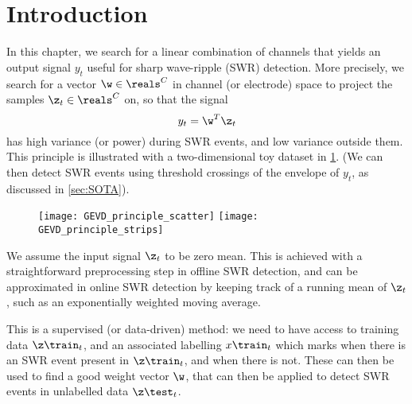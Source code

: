 \section{Introduction}
\label{sec:GEVD_overview}

In this chapter, we search for a linear combination of channels that yields
an output signal $y_t$ useful for sharp wave-ripple (SWR) detection. More
precisely, we search for a vector $\w \in \reals^C$ in channel (or electrode)
space to project the samples $\z_t \in \reals^C$ on, so that the signal
%
\begin{equation}
\label{eq:linear}
y_t = \w^T \z_t
\end{equation}
%
has high variance (or power) during SWR events, and low variance outside
them. This principle is illustrated with a two-dimensional toy dataset in
\cref{fig:GEVD_principle}. (We can then detect SWR events using threshold
crossings of the envelope of $y_t$, as discussed in \cref{sec:SOTA}).


\begin{figure}
\texttt{[image: GEVD\_principle\_scatter]}
\texttt{[image: GEVD\_principle\_strips]}
\label{fig:GEVD_principle}
\end{figure}


We assume the input signal $\z_t$ to be zero mean. This is achieved with a
straightforward preprocessing step in offline SWR detection, and can be
approximated in online SWR detection by keeping track of a running mean of
$\z_t$, such as an exponentially weighted moving average.

This is a supervised (or data-driven) method: we need to have access to
training data $\z\train_t$, and an associated labelling $x\train_t$ which
marks when there is an SWR event present in $\z\train_t$, and when there is
not. These can then be used to find a good weight vector $\w$, that can then
be applied to detect SWR events in unlabelled data $\z\test_t$.


